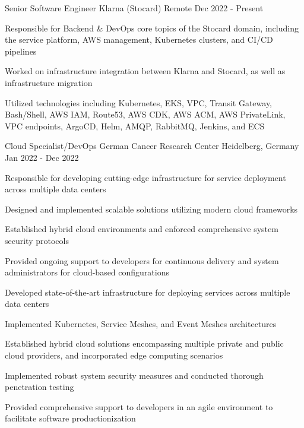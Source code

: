 \begin{cventries}
  \cventry
    {Senior Software Engineer} %
    {Klarna (Stocard)} %
    {Remote} %
    {Dec 2022 - Present} %
    {
      \begin{cvitems} %
        \item {Responsible for Backend \& DevOps core topics of the Stocard domain, including the service platform, AWS management, Kubernetes clusters, and CI/CD pipelines}
        \item {Worked on infrastructure integration between Klarna and Stocard, as well as infrastructure migration}
        \item {Utilized technologies including Kubernetes, EKS, VPC, Transit Gateway, Bash/Shell, AWS IAM, Route53, AWS CDK, AWS ACM, AWS PrivateLink, VPC endpoints, ArgoCD, Helm, AMQP, RabbitMQ, Jenkins, and ECS}\\
      \end{cvitems}
    }

  \cventry
    {Cloud Specialist/DevOps} %
    {German Cancer Research Center} %
    {Heidelberg, Germany} %
    {Jan 2022 - Dec 2022} %
    {
      \begin{cvitems} %
        \item {Responsible for developing cutting-edge infrastructure for service deployment across multiple data centers}
        \item {Designed and implemented scalable solutions utilizing modern cloud frameworks}
        \item {Established hybrid cloud environments and enforced comprehensive system security protocols}
        \item {Provided ongoing support to developers for continuous delivery and system administrators for cloud-based configurations}
        \item {Developed state-of-the-art infrastructure for deploying services across multiple data centers}
        \item {Implemented Kubernetes, Service Meshes, and Event Meshes architectures}
        \item {Established hybrid cloud solutions encompassing multiple private and public cloud providers, and incorporated edge computing scenarios}
        \item {Implemented robust system security measures and conducted thorough penetration testing}
        \item {Provided comprehensive support to developers in an agile environment to facilitate software productionization}\\
      \end{cvitems}
    }


\end{cventries}
